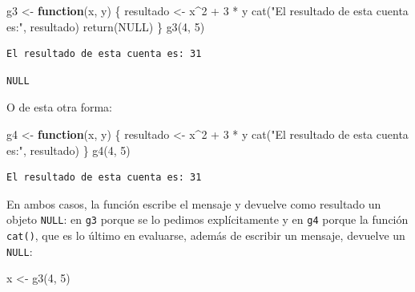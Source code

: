 \documentclass[
]{book}
\newenvironment{Shaded}{\begin{snugshade}}{\end{snugshade}}
\newcommand{\ConstantTok}[1]{\textcolor[rgb]{0.00,0.00,0.00}{#1}}
\newcommand{\ControlFlowTok}[1]{\textcolor[rgb]{0.13,0.29,0.53}{\textbf{#1}}}
\newcommand{\DecValTok}[1]{\textcolor[rgb]{0.00,0.00,0.81}{#1}}
\newcommand{\FunctionTok}[1]{\textcolor[rgb]{0.00,0.00,0.00}{#1}}
\newcommand{\NormalTok}[1]{#1}
\newcommand{\OtherTok}[1]{\textcolor[rgb]{0.56,0.35,0.01}{#1}}
\newcommand{\SpecialCharTok}[1]{\textcolor[rgb]{0.00,0.00,0.00}{#1}}
\newcommand{\StringTok}[1]{\textcolor[rgb]{0.31,0.60,0.02}{#1}}
\begin{document}
\begin{Shaded}
\begin{Highlighting}[]
\NormalTok{g3 }\OtherTok{\textless{}{-}} \ControlFlowTok{function}\NormalTok{(x, y) \{}
\NormalTok{    resultado }\OtherTok{\textless{}{-}}\NormalTok{ x}\SpecialCharTok{\^{}}\DecValTok{2} \SpecialCharTok{+} \DecValTok{3} \SpecialCharTok{*}\NormalTok{ y}
    \FunctionTok{cat}\NormalTok{(}\StringTok{"El resultado de esta cuenta es:"}\NormalTok{, resultado)}
    \FunctionTok{return}\NormalTok{(}\ConstantTok{NULL}\NormalTok{)}
\NormalTok{\}}
\FunctionTok{g3}\NormalTok{(}\DecValTok{4}\NormalTok{, }\DecValTok{5}\NormalTok{)}
\end{Highlighting}
\end{Shaded}

\begin{verbatim}
El resultado de esta cuenta es: 31
\end{verbatim}

\begin{verbatim}
NULL
\end{verbatim}

O de esta otra forma:

\begin{Shaded}
\begin{Highlighting}[]
\NormalTok{g4 }\OtherTok{\textless{}{-}} \ControlFlowTok{function}\NormalTok{(x, y) \{}
\NormalTok{    resultado }\OtherTok{\textless{}{-}}\NormalTok{ x}\SpecialCharTok{\^{}}\DecValTok{2} \SpecialCharTok{+} \DecValTok{3} \SpecialCharTok{*}\NormalTok{ y}
    \FunctionTok{cat}\NormalTok{(}\StringTok{"El resultado de esta cuenta es:"}\NormalTok{, resultado)}
\NormalTok{\}}
\FunctionTok{g4}\NormalTok{(}\DecValTok{4}\NormalTok{, }\DecValTok{5}\NormalTok{)}
\end{Highlighting}
\end{Shaded}

\begin{verbatim}
El resultado de esta cuenta es: 31
\end{verbatim}

En ambos casos, la función escribe el mensaje y devuelve como resultado un objeto \texttt{NULL}: en \texttt{g3} porque se lo pedimos explícitamente y en \texttt{g4} porque la función \texttt{cat()}, que es lo último en evaluarse, además de escribir un mensaje, devuelve un \texttt{NULL}:

\begin{Shaded}
\begin{Highlighting}[]
\NormalTok{x }\OtherTok{\textless{}{-}} \FunctionTok{g3}\NormalTok{(}\DecValTok{4}\NormalTok{, }\DecValTok{5}\NormalTok{)}
\end{Highlighting}
\end{Shaded}
\end{document}
